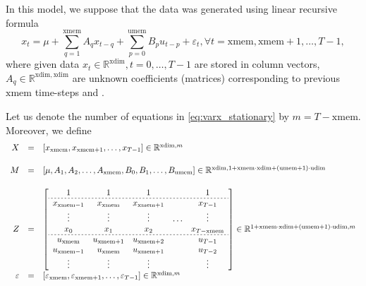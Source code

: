  In this model, we suppose that the data was generated using linear recursive formula
 \begin{equation}
  \label{eq:varx_stationary}
	x_t = \mu + \sum\limits_{q=1}^{\mathrm{xmem}} A_q x_{t-q} + \sum\limits_{p=0}^{\mathrm{umem}} B_p u_{t-p} + \varepsilon_t, \forall t = \mathrm{xmem}, \mathrm{xmem}+1, \dots, T-1,
 \end{equation}
 where given data $x_t \in \mathbb{R}^{\mathrm{xdim}}, t = 0,\dots,T-1$ are stored in column vectors, $A_q \in \mathbb{R}^{\mathrm{xdim},\mathrm{xdim}}$ are unknown coefficients (matrices) corresponding to previous $\mathrm{xmem}$ time-steps and .
  
 Let us denote the number of equations in \eqref{eq:varx_stationary} by $m = T-\mathrm{xmem}$.
 Moreover, we define 
 \begin{displaymath}
  \begin{array}{rcl}
   X & = & [x_{\mathrm{xmem}}, x_{\mathrm{xmem}+1}, \dots, x_{T-1}] \in \mathbb{R}^{\mathrm{xdim},m} \\[5mm]
   M & = & [\mu, A_1, A_2, \dots, A_{\mathrm{xmem}}, B_0, B_1, \dots, B_{\mathrm{umem}} ] \in \mathbb{R}^{\mathrm{xdim},1+\mathrm{xmem}\cdot\mathrm{xdim}+(\mathrm{umem}+1)\cdot\mathrm{udim}}\\[5mm]
   Z & = & \left[
	\begin{array}{ccccc}
	 1 & 1 & 1 & & 1 \\ \hdashline[2pt/2pt]
	 x_{\mathrm{xmem}-1} & x_{\mathrm{xmem}} & x_{\mathrm{xmem}+1} & & x_{T-1} \\
	 \vdots & \vdots & \vdots & \dots & \vdots \\
	 x_0 & x_1 & x_2 & & x_{T-\mathrm{xmem}} \\ \hdashline[2pt/2pt]
	 u_{\mathrm{xmem}} & u_{\mathrm{xmem}+1} & u_{\mathrm{xmem}+2} & & u_{T-1} \\
	 u_{\mathrm{xmem}-1} & u_{\mathrm{xmem}} & u_{\mathrm{xmem}+1} & & u_{T-2} \\
	 \vdots & \vdots & \vdots & & \vdots 
    \end{array}
   \right] \in \mathbb{R}^{1+\mathrm{xmem}\cdot\mathrm{xdim}+(\mathrm{umem}+1)\cdot\mathrm{udim},m} \\[5mm]
   \varepsilon & = & [\varepsilon_{\mathrm{xmem}}, \varepsilon_{\mathrm{xmem}+1}, \dots, \varepsilon_{T-1}] \in \mathbb{R}^{\mathrm{xdim},m}
  \end{array}
 \end{displaymath}

